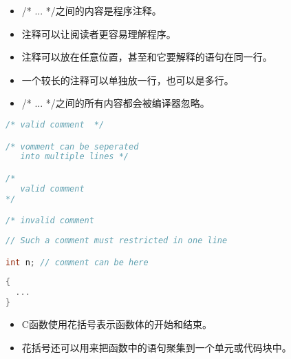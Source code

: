 \begin{frame}
  
  


  \begin{overprint}
    \begin{itemize}
    \item {\tf /* ... */}之间的内容是程序注释。\\[0.1in]
    \item 注释可以让阅读者更容易理解程序。\\[0.1in]
    \item 注释可以放在任意位置，甚至和它要解释的语句在同一行。\\[0.1in]
    \item 一个较长的注释可以单独放一行，也可以是多行。\\[0.1in]
    \item {\tf /* ... */}之间的所有内容都会被编译器忽略。
    \end{itemize}
  \end{overprint}

\end{frame}

\begin{frame}[fragile]
  \begin{lstlisting}[language=c]
/* valid comment  */

/* vomment can be seperated 
   into multiple lines */

/*
   valid comment
*/

/* invalid comment
  \end{lstlisting}

  \begin{lstlisting}[language=c]
// Such a comment must restricted in one line

int n; // comment can be here
  \end{lstlisting}
\end{frame}

\begin{frame}[fragile]
  
  \begin{lstlisting}[language=c,frame=tb]
{
  ...
}
  \end{lstlisting}
  
  \begin{itemize}
  \item
    C函数使用花括号表示函数体的开始和结束。\\[0.2in]
  \item
    花括号还可以用来把函数中的语句聚集到一个单元或代码块中。
  \end{itemize}
\end{frame}

